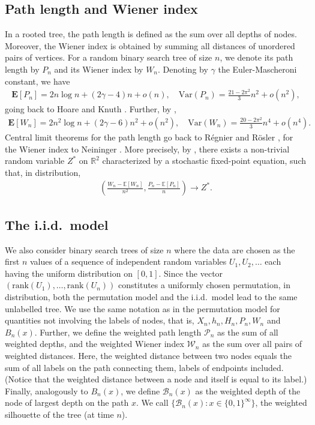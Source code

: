 \documentclass{amsart}       %
\newcommand{\R}{\ensuremath{\mathbb{R}}}
\newcommand{\E}[1]{\ensuremath{\mathbf{E} \left[#1 \right]}}
\begin{document}
\subsection{Path length and Wiener index} \label{sec:pw}
In a rooted tree, the path length is defined as the sum over all depths of nodes. Moreover, the Wiener index is obtained by summing  all distances of unordered pairs of vertices. For a random binary search tree of size $n$, we denote its path length by $P_n$ and its Wiener index by $W_n$.
Denoting by $\gamma$ the Euler-Mascheroni constant, 
we have
\begin{align} \label{meanpath}
 \E{P_n} = 2n \log n + (2\gamma -4 )n + o(n),  \quad \text{Var}(P_n) = \frac{21 - 2 \pi^2}{3} n^2 + o(n^2),  \end{align}
going back to Hoare \cite{hoare} and Knuth \cite{knuth1973b}. Further, by \cite{newiener}, \begin{align} \label{meanwiener} \E{W_n} = 2n^2 \log n + (2\gamma -6)n^2 + o(n^2), \quad  \text{Var}(W_n) = \frac{20 - 2 \pi^2}{3}  n^4 + o(n^4). \end{align}
Central limit theorems for the path length go back to
R{\'e}gnier \cite{regnier} and R{\"o}sler \cite{ro91}, for the Wiener index to Neininger \cite{newiener}. More precisely, by \cite[Theorem 1.1]{newiener}, there exists a non-trivial random variable $Z^*$ on $\R^2$ characterized by a stochastic fixed-point equation, such that, in distribution, 
 \begin{align}
\left(\frac{W_n-\mathbb{E}[W_n]}{n^2},\frac{P_n-\mathbb{E}[P_n]}{n}\right) \to Z^*. \label{lim_oldnei}
\end{align}

\subsection{The i.i.d.\ model} \label{sec:iid}
We also consider binary search trees of size $n$ where the data are chosen as the first $n$ values of a sequence of independent random variables $U_1, U_2, \ldots$ each having the uniform distribution on $[0,1]$. 
Since the vector $(\text{rank}(U_1), \ldots, \text{rank}(U_n))$ constitutes a uniformly chosen permutation, in distribution,  both the permutation model and the i.i.d.\ model lead to the same unlabelled tree. We use the same notation as in the permutation model 
for quantities not involving the labels of nodes, that is, $X_n, h_n, H_n, P_n, W_n$ and $B_n(x)$. Further, we define the weighted path length $\mathcal{P}_n$ as the sum of all weighted depths, and the weighted Wiener index $\mathcal{W}_n$ as the sum over all pairs of weighted distances. Here, the weighted distance between two nodes equals the sum of all labels on the path connecting them, labels of endpoints included. (Notice that the weighted distance between a node and itself is equal to its label.) Finally, analogously to $B_n(x)$, we define $\mathcal B_n(x)$ as the weighted depth of the node of largest depth on the path $x$. We call $\{\mathcal B_n(x): x \in \{0,1 \}^\infty\}$, the weighted silhouette of the tree (at time $n$). 
\end{document}

